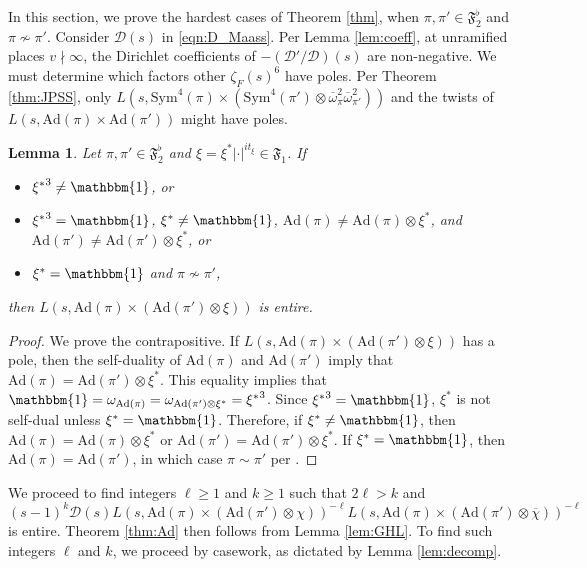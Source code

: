 \documentclass[11pt]{amsart}
\newtheorem{lemma}[theorem]{Lemma}
\theoremstyle{remark}
\numberwithin{equation}{section}
\begin{document}
In this section, we prove the hardest cases of Theorem \ref{thm}, when $\pi,\pi'\in\mathfrak{F}_{2}^{\flat}$ and $\pi\not\sim\pi'$.  Consider $\mathcal{D}(s)$ in \eqref{eqn:D_Maass}.  Per Lemma \ref{lem:coeff}, at unramified places $v\nmid\infty$, the Dirichlet coefficients of $-(\mathcal{D}'/\mathcal{D})(s)$ are non-negative.  We must determine which factors other $\zeta_F(s)^6$ have poles.  Per Theorem \ref{thm:JPSS}, only $L(s,\mathrm{Sym}^4(\pi)\times(\mathrm{Sym}^4(\pi')\otimes\overline{\omega}_{\pi}^2\overline{\omega}_{\pi'}^2))$ and the twists of $L(s,\mathrm{Ad}(\pi)\times\mathrm{Ad}(\pi'))$ might have poles.
\begin{lemma}
\label{lem:Ramakrishnan_multiplicity_one}
Let $\pi,\pi'\in\mathfrak{F}_{2}^{\flat}$ and $\xi=\xi^*|\cdot|^{it_{\xi}}\in\mathfrak{F}_{1}$.  If
\begin{itemize}
	\item ${\xi^*}^3\neq\mathbbm{1}$, or
	\item ${\xi^*}^3=\mathbbm{1}$, $\xi^*\neq\mathbbm{1}$, $\mathrm{Ad}(\pi)\neq\mathrm{Ad}(\pi)\otimes\xi^*$, and $\mathrm{Ad}(\pi')\neq\mathrm{Ad}(\pi')\otimes\xi^*$, or
	\item $\xi^*=\mathbbm{1}$ and $\pi\not\sim\pi'$,
\end{itemize}
then $L(s,\mathrm{Ad}(\pi)\times(\mathrm{Ad}(\pi')\otimes\xi))$ is entire.
\end{lemma}
\begin{proof}
We prove the contrapositive.  If $L(s,\mathrm{Ad}(\pi)\times(\mathrm{Ad}(\pi')\otimes\xi))$ has a pole, then the self-duality of $\mathrm{Ad}(\pi)$ and $\mathrm{Ad}(\pi')$ imply that $\mathrm{Ad}(\pi)=\mathrm{Ad}(\pi')\otimes\xi^*$.  This equality implies that $\mathbbm{1}=\omega_{\mathrm{Ad}(\pi)}=\omega_{\mathrm{Ad}(\pi')\otimes\xi^*}={\xi^*}^3$.  Since ${\xi^*}^3=\mathbbm{1}$, $\xi^*$ is not self-dual unless $\xi^*=\mathbbm{1}$.  Therefore, if $\xi^*\neq\mathbbm{1}$, then $\mathrm{Ad}(\pi)=\mathrm{Ad}(\pi)\otimes\xi^*$ or $\mathrm{Ad}(\pi')=\mathrm{Ad}(\pi')\otimes\xi^*$.  If $\xi^*=\mathbbm{1}$, then $\mathrm{Ad}(\pi)=\mathrm{Ad}(\pi')$, in which case $\pi\sim\pi'$ per \cite[Theorem 4.1.2]{Ramakrishnan}.
\end{proof}


We proceed to find integers $\ell\geq 1$ and $k\geq 1$ such that $2\ell>k$ and
\begin{equation}
\label{eqn:ell_and_k}
(s-1)^k\mathcal{D}(s)L(s,\mathrm{Ad}(\pi)\times(\mathrm{Ad}(\pi')\otimes\chi))^{-\ell} L(s,\mathrm{Ad}(\pi)\times(\mathrm{Ad}(\pi')\otimes\overline{\chi}))^{-\ell}
\end{equation}
is entire.  Theorem \ref{thm:Ad} then follows from Lemma \ref{lem:GHL}.  To find such integers $\ell$ and $k$, we proceed by casework, as dictated by Lemma \ref{lem:decomp}.
\end{document}
